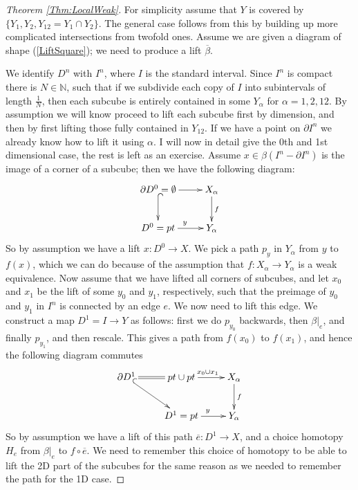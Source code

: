 \documentclass{article}
\newtheorem{proposed work}[theorem]{Proposed Work}
\theoremstyle{definition}
\newcommand{\xymat}[1]{\begin{align*}\xymatrix{ #1}\end{align*}}
\begin{document}
\begin{proof}[Theorem \ref{Thm:LocalWeak}]
For simplicity assume that $Y$ is covered by $\{Y_1,Y_2,Y_{12}=Y_1\cap Y_2\}$. The general case follows from this by building up more complicated intersections from twofold ones. Assume we are given a diagram of shape (\ref{LiftSquare}); we need to produce a lift $\overline{\beta}$. 

We identify $D^n$ with $I^n$, where $I$ is the standard interval. Since $I^n$ is compact there is $N\in \mathbb{N}$, such that if we subdivide each copy of $I$ into subintervals of length $\frac{1}{N}$, then each subcube is entirely contained in some $Y_\alpha$ for $\alpha=1,2,12$. By assumption we will know proceed to lift each subcube first by dimension, and then by first lifting those fully contained in $Y_{12}$. If we have a point on $\partial I^n$ we already know how to lift it using $\alpha$. I will now in detail give the 0th and 1st dimensional case, the rest is left as an exercise. Assume $x\in \beta(I^n-\partial I^n)$ is the image of a corner of a subcube; then we have the following diagram:
\xymat{\partial D^0 =\emptyset \ar[r] \ar@{^{(}->}[d] & X_\alpha \ar[d]^f \\ D^0=pt \ar[r]^y & Y_\alpha }
So by assumption we have a lift $x:D^0 \to X$. We pick a path $p_y$ in $Y_\alpha$ from  $y$ to $f(x)$, which we can do because of the assumption that $f:X_\alpha \to Y_\alpha$ is a weak equivalence. Now assume that we have lifted all corners of subcubes, and let $x_0$ and $x_1$ be the lift of some $y_0$ and $y_1$, respectively, such that the preimage of $y_0$ and $y_1$ in $I^n$ is connected by an edge $e$. We now need to lift this edge. We construct a map $D^1=I \to Y$ as follows: first we do $p_{y_0}$ backwards, then $\beta|_e$, and finally $p_{y_1}$, and then rescale. This gives a path from $f(x_0)$ to $f(x_1)$, and hence the following diagram commutes
\xymat{\partial D^1 \ar@{=}[r]\ar@{^{(}->}[dr]& pt \cup pt \ar[r]^{x_0 \cup x_1}  & X_\alpha \ar[d]^f \\ & D^1=pt \ar[r]^y & Y_\alpha}
So by assumption we have a lift of this path $\overline{e}: D^1\to X$, and a choice homotopy $H_e$ from $\beta|_e$ to $f\circ \overline{e}$. We need to remember this choice of homotopy to be able to lift the 2D part of the subcubes for the same reason as we needed to remember the path for the 1D case.
\end{proof}
\end{document}

